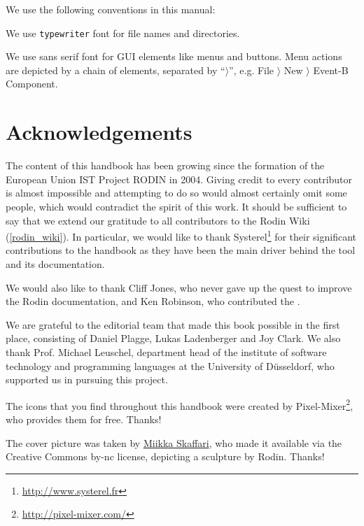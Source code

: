 \documentclass[twoside,10pt]{book}
\begin{document}
We use the following conventions in this manual:


We use \texttt{typewriter} font for file names and directories.

We use \textsf{sans serif font} for GUI elements like menus and buttons.  Menu actions are depicted by a chain of elements, separated by ``$\rangle$'', e.g. \textsf{File $\rangle$ New $\rangle$ Event-B Component}.

\section{Acknowledgements}
\label{sec:acknowledgements}

The content of this handbook has been growing since the formation of the European Union IST Project RODIN in 2004.  Giving credit to every contributor is almost impossible and attempting to do so would almost certainly omit some people, which would contradict the spirit of this work.  It should be sufficient to say that we extend our gratitude to all contributors to the Rodin Wiki (\ref{rodin_wiki}). In particular, we would like to thank Systerel\footnote{\url{http://www.systerel.fr}} for their significant contributions to the handbook as they have been the main driver behind the tool and its documentation.

We would also like to thank Cliff Jones, who never gave up the quest to improve the Rodin documentation, and Ken Robinson, who contributed the .

We are grateful to the editorial team that made this book possible in the first place, consisting of Daniel Plagge, Lukas Ladenberger and Joy Clark.  We also thank Prof. Michael Leuschel, department head of the institute of software technology and programming languages at the University of Düsseldorf, who supported us in pursuing this project.

The icons that you find throughout this handbook were created by Pixel-Mixer\footnote{\url{http://pixel-mixer.com/}}, who provides them for free.  Thanks!

The cover picture was taken by \href{http://www.skaffari.fi/}{Miikka Skaffari}, who made it available via the Creative Commons by-nc license, depicting a sculpture by Rodin.  Thanks!
\end{document}
